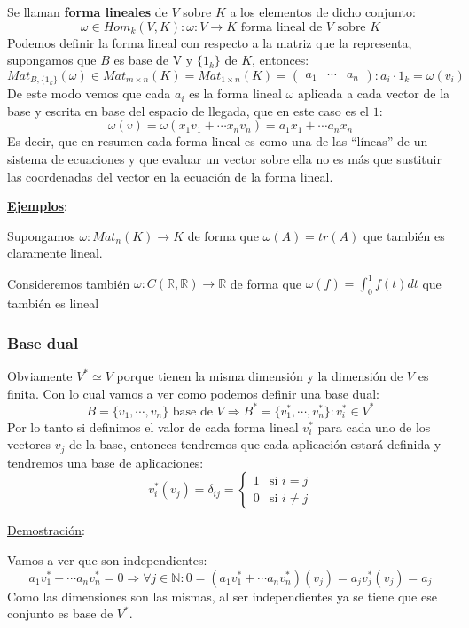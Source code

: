 \documentclass[10pt,a4paper,openright]{book}
\begin{document}
Se llaman \textbf{forma lineales} de $V$ sobre $K$ a los elementos de dicho conjunto:
$$\omega \in Hom_k(V,K): \omega: V\rightarrow K\mbox{ forma lineal de }V\mbox{ sobre }K$$
Podemos definir la forma lineal con respecto a la matriz que la representa, supongamos que $B$ es base de V y $\{1_k\}$ de $K$, entonces:
$$Mat_{B,\{1_k\}}(\omega)\in Mat_{m\times n}(K)=Mat_{1\times n}(K)=\begin{pmatrix} a_1 & \cdots & a_n \end{pmatrix}: a_i\cdot 1_k = \omega (v_i)$$
De este modo vemos que cada $a_i$ es la forma lineal $\omega$ aplicada a cada vector de la base y escrita en base del espacio de llegada, que en este caso es el $1$:
$$\omega(v)=\omega(x_1v_1+\cdots x_nv_n)=a_1x_1+\cdots a_nx_n$$
Es decir, que en resumen cada forma lineal es como una de las ``líneas'' de un sistema de ecuaciones y que evaluar un vector sobre ella no es más que sustituir las coordenadas del vector en la ecuación de la forma lineal.

\underline{\textbf{Ejemplos}}:

Supongamos $\omega: Mat_n(K)\rightarrow K$ de forma que $\omega(A)=tr(A)$ que también es claramente lineal.

Consideremos también $\omega: C(\mathbb R, \mathbb R)\rightarrow \mathbb R$ de forma que $\omega(f)=\int_0^1 f(t)dt$ que también es lineal

\subsubsection*{Base dual}
Obviamente $V^*\simeq V$ porque tienen la misma dimensión y la dimensión de $V$ es finita. Con lo cual vamos a ver como podemos definir una base dual:
$$B=\{v_1, \cdots , v_n\}\mbox{ base de }V\Rightarrow B^*=\{v_1^*, \cdots , v_n^*\}: v_i^*\in V^*$$
Por lo tanto si definimos el valor de cada forma lineal $v_i^*$ para cada uno de los vectores $v_j$ de la base, entonces tendremos que cada aplicación estará definida y tendremos una base de aplicaciones:
$$v_i^*(v_j)=\delta_{ij}=\begin{cases} 1 &\mbox{si }i=j\\ 0 &\mbox{si }i\neq j\end{cases}$$

\underline{Demostración}:

Vamos a ver que son independientes:
$$a_1v_1^* +\cdots a_nv_n^*=0\Rightarrow \forall j\in \mathbb N : 0=(a_1v_1^*+\cdots a_nv_n^*)(v_j)= a_jv_j^*(v_j)=a_j$$
Como las dimensiones son las mismas, al ser independientes ya se tiene que ese conjunto es base de $V^*$.
\end{document}
